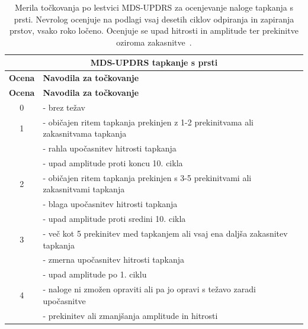 \documentclass[a4paper,12pt]{article}  %
\begin{document}
\begin{table}[H]
    \centering
    \renewcommand{\arraystretch}{1.3} %
    \begin{longtable}{|c|p{12cm}|}
        \hline
        \multicolumn{2}{|c|}{\textbf{MDS-UPDRS tapkanje s prsti}} \\
        \hline
        \textbf{Ocena} & \textbf{Navodila za točkovanje} \\
        \hline
        \endfirsthead

        \hline
        \textbf{Ocena} & \textbf{Navodila za točkovanje} \\
        \hline
        \endhead

        0 & - brez težav \\
        \hline
        1 & - običajen ritem tapkanja prekinjen z 1-2 prekinitvama ali zakasnitvama tapkanja \\ 
          & - rahla upočasnitev hitrosti tapkanja \\ 
          & - upad amplitude proti koncu 10. cikla \\
        \hline
        2 & - običajen ritem tapkanja prekinjen s 3-5 prekinitvami ali zakasnitvami tapkanja \\ 
          & - blaga upočasnitev hitrosti tapkanja \\ 
          & - upad amplitude proti sredini 10. cikla \\
        \hline
        3 & - več kot 5 prekinitev med tapkanjem ali vsaj ena daljša zakasnitev tapkanja \\ 
          & - zmerna upočasnitev hitrosti tapkanja \\ 
          & - upad amplitude po 1. ciklu \\
        \hline
        4 & - naloge ni zmožen opraviti ali pa jo opravi s težavo zaradi upočasnitve \\ 
          & - prekinitev ali zmanjšanja amplitude in hitrosti \\
        \hline
    \end{longtable}
    \caption{Merila točkovanja po lestvici MDS-UPDRS za ocenjevanje naloge tapkanja s prsti. Nevrolog ocenjuje na 
    podlagi vsaj desetih ciklov odpiranja in zapiranja prstov, vsako roko ločeno. Ocenjuje se upad hitrosti in 
    amplitude ter prekinitve oziroma zakasnitve~\cite{Stamatakis}.}
    \label{tab:mds_updrs}
\end{table}

\end{document}
